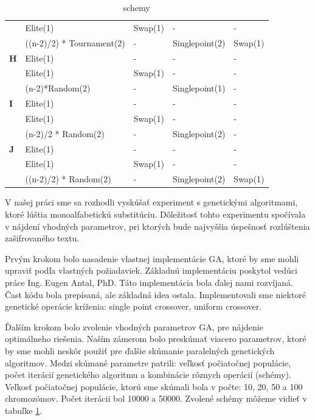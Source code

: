 \begin{table}[!h]
\begin{tabular}{@{}lllll@{}}
                & Elite(1)                  & Swap(1)          & -                 & -                    \\
                & ((n-2)/2) * Tournament(2) & -                & Singlepoint(2)    & Swap(1)              \\ \midrule
\textbf{H}      & Elite(1)                  & -                & -                 & -                    \\
                & Elite(1)                  & Swap(1)          & -                 & -                    \\
                & (n-2)*Random(2)           & -                & Singlepoint(1)    & -                    \\ \midrule
\textbf{I}      & Elite(1)                  & -                & -                 & -                    \\
                & Elite(1)                  & Swap(1)          & -                 & -                    \\
                & (n-2)/2 * Random(2)       & -                & Singlepoint(2)    & -                    \\ \midrule
\textbf{J}      & Elite(1)                  & -                & -                 & -                    \\
                & Elite(1)                  & Swap(1)          & -                 & -                    \\
                & ((n-2)/2) * Random(2)     & -                & Singlepoint(2)    & Swap(1)              \\ \bottomrule
\end{tabular}
\caption{schemy}
\label{tab:schemy}
\end{table}

V našej práci sme sa rozhodli vyskúšať experiment s genetickými algoritmami, ktoré lúštia monoalfabetickú substitúciu.
Dôležitosť tohto experimentu spočívala v nájdení vhodných parametrov, pri ktorých bude najvyššia úspešnosť rozlúštenia zašifrovaného textu.

Prvým krokom bolo nasadenie vlastnej implementácie GA, ktoré by sme mohli upraviť podľa vlastných požiadaviek.
Základnú implementáciu poskytol vedúci práce Ing. Eugen Antal, PhD. Táto implementácia bola ďalej nami rozvíjaná.
Čast kódu bola prepísaná, ale základná idea ostala.
Implementovali sme niektoré genetické operácie kríženia: single point crossover, uniform crossover.

Ďalším krokom bolo zvolenie vhodných parametrov GA, pre nájdenie optimálneho riešenia.
Naším zámerom bolo preskúmať viacero parametrov, ktoré by sme mohli neskôr použiť pre ďalšie skúmanie paralelných genetických algoritmov. 
Medzi skúmané parametre patrili: veľkosť počiatočnej populácie, počet iterácií genetického algoritmu a kombinácie rôznych operácií (schémy).
Veľkosť počiatočnej populácie, ktorú sme skúmali bola v počte: 10, 20, 50 a 100 chromozómov. Počet iterácii bol 10000 a 50000. 
Zvolené schémy môžeme vidieť v tabuľke \ref{tab:schemy}.

